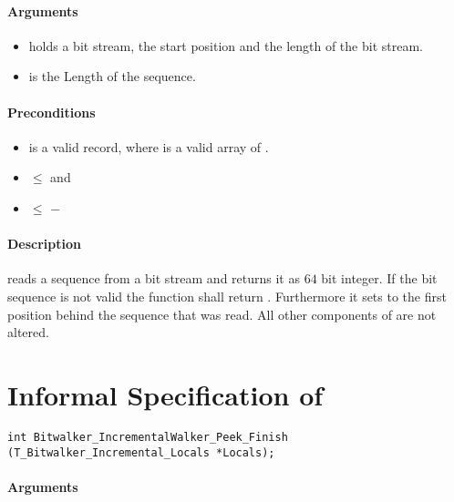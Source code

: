 \paragraph{Arguments}
\begin{itemize}
    \item  {} holds a bit stream, the start position and the length of the bit stream.
   \item {} is the Length of the sequence.
\end{itemize}

\paragraph{Preconditions}
\begin{itemize}
    \item  {} is a valid record, where  is a valid array of .
    \item {} $\leq$  and
    \item {} $\leq $  $-$ 
\end{itemize}

\paragraph{Description}

\peeknext reads a sequence from a bit stream and  returns it as $64$ bit integer. If the bit sequence is not valid the function shall return . Furthermore  it sets  to the first position behind the sequence that was read. All other components of  are not altered.




\clearpage

\section{Informal Specification of }

\begin{lstlisting}[style=acsl-block]
int Bitwalker_IncrementalWalker_Peek_Finish (T_Bitwalker_Incremental_Locals *Locals);
\end{lstlisting}

\paragraph{Arguments}

